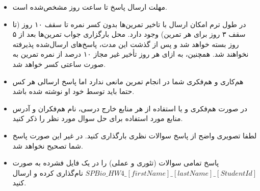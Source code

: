 \begin{itemize}
	\small
	\setlength\itemsep{0.05em}
	\item
	مهلت ارسال پاسخ تا ساعت  روز مشخص‌شده است.
	\item
	در طول ترم امکان ارسال با تاخیر تمرین‌ها بدون کسر نمره تا سقف ۱۰ روز (تا سقف ۳ روز برای هر تمرین) وجود دارد. محل بارگزاری جواب تمرین‌ها بعد از ۵ روز بسته خواهد شد و پس از گذشت این مدت، پاسخ‌های ارسال‌شده پذیرفته نخواهند ‌شد. همچنین، به ازای هر روز تأخیر غیر مجاز ۱۰ درصد از نمره تمرین به صورت ساعتی کسر خواهد شد.
	\item		
	هم‌کاری و هم‌فکری شما در انجام تمرین مانعی ندارد اما پاسخ ارسالی هر کس حتما باید توسط خود او نوشته شده‌ باشد. 
	\item
	در صورت هم‌فکری و یا استفاده از هر منابع خارج درسی، نام هم‌فکران و آدرس منابع مورد استفاده ‌برای حل سوال مورد نظر را ذکر‌ کنید.
	\item
	لطفا تصویری واضح از پاسخ سوالات نظری بارگذاری کنید. در غیر این صورت پاسخ شما تصحیح نخواهد شد.
	\item
	\footnotesize
پاسخ تمامی سوالات (تئوری و عملی) را در یک فایل فشرده به صورت 
\scriptsize
	$SPBio\_HW4\_[firstName]\_[lastName]\_[StudentId]$
	\footnotesize
	نام‌گذاری کرده و ارسال کنید.
\end{itemize}